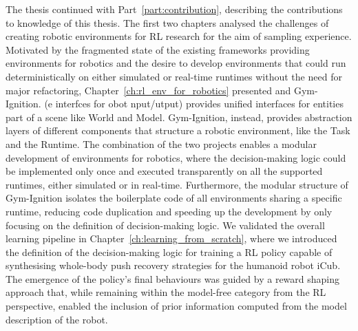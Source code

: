 The thesis continued with Part~\ref{part:contribution}, describing the contributions to knowledge of this thesis.
The first two chapters analysed the challenges of creating robotic environments for \ac{RL} research for the aim of sampling experience.
Motivated by the fragmented state of the existing frameworks providing environments for robotics and the desire to develop environments that could run deterministically on either simulated or real-time runtimes without the need for major refactoring, Chapter~\ref{ch:rl_env_for_robotics} presented \scenario and Gym-Ignition.
\scenario (e interfces for obot nput/utput) provides unified interfaces for entities part of a scene like World and Model.
Gym-Ignition, instead, provides abstraction layers of different components that structure a robotic environment, like the Task and the Runtime.
The combination of the two projects enables a modular development of environments for robotics, where the decision-making logic could be implemented only once and executed transparently on all the supported runtimes, either simulated or in real-time.
Furthermore, the modular structure of Gym-Ignition isolates the boilerplate code of all environments sharing a specific runtime, reducing code duplication and speeding up the development by only focusing on the definition of decision-making logic.
We validated the overall learning pipeline in Chapter~\ref{ch:learning_from_scratch}, where we introduced the definition of the decision-making logic for training a \ac{RL} policy capable of synthesising whole-body push recovery strategies for the humanoid robot iCub.
The emergence of the policy's final behaviours was guided by a reward shaping approach that, while remaining within the model-free category from the \ac{RL} perspective, enabled the inclusion of prior information computed from the model description of the robot.

